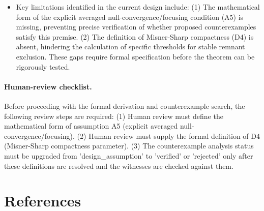 \documentclass[conference]{IEEEtran}
\begin{document}
\begin{itemize}
\item Key limitations identified in the current design include: (1) The mathematical form of the explicit averaged null-convergence/focusing condition (A5) is missing, preventing precise verification of whether proposed counterexamples satisfy this premise. (2) The definition of Misner-Sharp compactness (D4) is absent, hindering the calculation of specific thresholds for stable remnant exclusion. These gaps require formal specification before the theorem can be rigorously tested.
\end{itemize}

\paragraph{Human-review checklist.} Before proceeding with the formal derivation and counterexample search, the following review steps are required: (1) Human review must define the mathematical form of assumption A5 (explicit averaged null-convergence/focusing). (2) Human review must supply the formal definition of D4 (Misner-Sharp compactness parameter). (3) The counterexample analysis status must be upgraded from 'design\_assumption' to 'verified' or 'rejected' only after these definitions are resolved and the witnesses are checked against them.\section*{References}
\nocite{cite_07d6df5d6978a1fc,cite_0ed84243cf171bc4,cite_1e54e3c2b35110ad,cite_2576833bf7ef143a,cite_283d00782f1f9ecb,cite_357dd780a9e3a378,cite_364386a3569b6e66,cite_37ecbded9d629353,cite_42e341ff6471ce89,cite_572fec0a1e5d74d9,cite_5ea4dc0e1b288757,cite_63476e0b002da386,cite_72d7ff391b29c495,cite_789b47fb0241d9ae,cite_7a407c865faafd11,cite_7a44e6730c44cb39,cite_7ae92f06684c60ef,cite_977568cf7b8a55bf,cite_98c5e596c0c34b68,cite_bfae3a92efd1d48f,cite_c369df652181e8f7,cite_cbbced417410bc6c,cite_cc5bc07a219047b4,cite_d3016ce6d1faa8ec,cite_e228b5fd31e37646,cite_e7b42f305bc08498,cite_ecea60a2300e4892,cite_f634820e22d7a238,cite_fd0f77b2a173c0ab}


\end{document}
